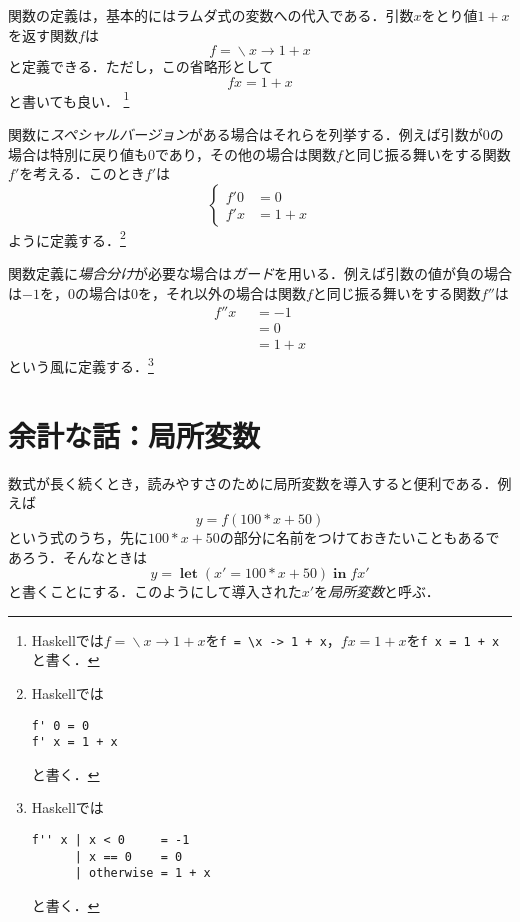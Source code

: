 \documentclass[twocolumn]{jsbook}
\newcommand{\keyword}[1]{{\emph{#1}}}
\newcommand{\code}[1]{\texttt{#1}}
\newcommand{\mathKeyword}[1]{\mathbf{#1}}
\DeclareMathOperator{\mathLambda}{\backslash}
\DeclareMathOperator{\mathLet}{\mathKeyword{let}}
\DeclareMathOperator{\mathLetIn}{\mathKeyword{in}}
\newcommand{\mathLambdaArrow}{\rightarrow}
\newcommand{\mathOtherwise}{\mathKeyword{otherwise}}
\newcommand{\mathGuard}[1]{\mathop{\mid_{#1}}}
\newcommand{\mathLambdaExpression}[2]{\mathLambda#1\mathLambdaArrow#2}
\begin{document}
関数の定義は，基本的にはラムダ式の変数への代入である．引数$x$をとり値$1+x$を返す関数$f$は$$f=\mathLambdaExpression{x}{1+x}$$と定義できる．ただし，この省略形として$$fx=1+x$$と書いても良い．
\footnote{Haskellでは$f=\mathLambdaExpression{x}{1+x}$を\code{f = \textbackslash x -> 1 + x}，$fx=1+x$を\code{f x = 1 + x}と書く．}

関数に\keyword{スペシャルバージョン}がある場合はそれらを列挙する．例えば引数が$0$の場合は特別に戻り値も$0$であり，その他の場合は関数$f$と同じ振る舞いをする関数$f'$を考える．このとき$f'$は
\begin{equation*}
\left\{
\begin{split}
f'0&=0\\
f'x&=1+x
\end{split}
\right.
\end{equation*}
ように定義する．\footnote{Haskellでは
\begin{Verbatim}[xleftmargin=10mm]
f' 0 = 0
f' x = 1 + x
\end{Verbatim}
と書く．}

関数定義に\keyword{場合分け}が必要な場合は\keyword{ガード}を用いる．例えば引数の値が負の場合は$-1$を，$0$の場合は$0$を，それ以外の場合は関数$f$と同じ振る舞いをする関数$f''$は
\begin{equation*}
\begin{split}
f''x&\mathGuard{x<0}=-1\\
&\mathGuard{x\equiv 0}=0\\
&\mathGuard{\mathOtherwise}=1+x
\end{split}
\end{equation*}
という風に定義する．\footnote{Haskellでは
\begin{Verbatim}[xleftmargin=10mm]
f'' x | x < 0     = -1
      | x == 0    = 0
      | otherwise = 1 + x
\end{Verbatim}
と書く．}

\section{余計な話：局所変数}

数式が長く続くとき，読みやすさのために局所変数を導入すると便利である．例えば$$y=f(100*x+50)$$という式のうち，先に$100*x+50$の部分に名前をつけておきたいこともあるであろう．そんなときは
\begin{equation}
\label{eq:letin}
y=\mathLet(x'=100*x+50)\mathLetIn fx'
\end{equation}
と書くことにする．このようにして導入された$x'$を\keyword{局所変数}と呼ぶ．
\end{document}
